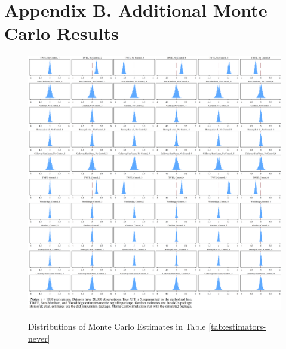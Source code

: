 \documentclass[12pt]{article}
\begin{document}
\section*{Appendix B. Additional Monte Carlo Results} \label{sec:appendixb}

\begin{figure}[H]
    \centering
    \caption{Distributions of Monte Carlo Estimates in Table \ref{tab:estimators-never}}
    \includegraphics[width=6in]{Figures/Histograms of Monte Carlo Estimates 1.png}
    \label{fig:hist1}
\end{figure}
\end{document}
